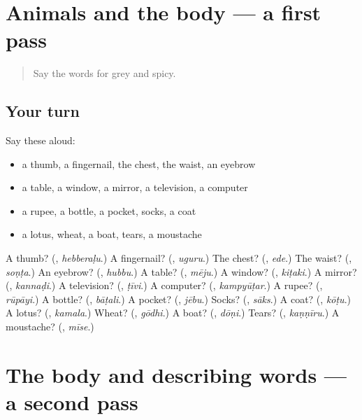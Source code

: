 \section[(dialogue)]{Animals and the body — a first pass}

\label{lesson:KA-R144-first-pass-animals-and-the-body}



\begin{quote}
Say the words for grey and spicy.
\end{quote}

\subsection*{Your turn}
Say these aloud:

\begin{itemize}
\raggedright
  \item a thumb, a fingernail, the chest, the waist, an eyebrow
  \item a table, a window, a mirror, a television, a computer
  \item a rupee, a bottle, a pocket, socks, a coat
  \item a lotus, wheat, a boat, tears, a moustache
\end{itemize}

\begin{tcolorbox}[breakable,colback=teal!4,colframe=teal!35!black,title={Before you move on}]
A thumb? (\textbf{}, \emph{hebberaḷu}.) A fingernail? (\textbf{}, \emph{uguru}.) The chest? (\textbf{}, \emph{ede}.) The waist? (\textbf{}, \emph{soṇṭa}.) An eyebrow? (\textbf{}, \emph{hubbu}.) A table? (\textbf{}, \emph{mēju}.) A window? (\textbf{}, \emph{kiṭaki}.) A mirror? (\textbf{}, \emph{kannaḍi}.) A television? (\textbf{}, \emph{ṭīvi}.) A computer? (\textbf{}, \emph{kampyūṭar}.) A rupee? (\textbf{}, \emph{rūpāyi}.) A bottle? (\textbf{}, \emph{bāṭali}.) A pocket? (\textbf{}, \emph{jēbu}.) Socks? (\textbf{}, \emph{sāks}.) A coat? (\textbf{}, \emph{kōṭu}.) A lotus? (\textbf{}, \emph{kamala}.) Wheat? (\textbf{}, \emph{gōdhi}.) A boat? (\textbf{}, \emph{dōṇi}.) Tears? (\textbf{}, \emph{kaṇṇīru}.) A moustache? (\textbf{}, \emph{mīse}.)
\end{tcolorbox}
\section[(dialogue)]{The body and describing words — a second pass}

